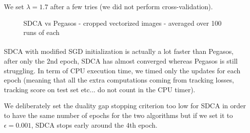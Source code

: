 \documentclass[10pt,a4paper]{article}
\begin{document}
We set $\lambda = 1.7$ after a few tries (we did not perform cross-validation). 


\begin{figure}[!tbp]
  \centering
  \hfill
  \hfill
  \caption{SDCA vs Pegasos - cropped vectorized images - averaged over 100 runs of each}\label{comparison_original}
\end{figure}


\paragraph{}
SDCA with modified SGD initialization is actually a lot faster than Pegasos, after only the $2$nd epoch, SDCA has almost converged whereas Pegasos is still struggling. In term of CPU execution time, we timed only the updates for each epoch (meaning that all the extra computations coming from tracking losses, tracking score on test set etc... do not count in the CPU timer).

We deliberately set the duality gap stopping criterion too low for SDCA in order to have the same number of epochs for the two algorithms but if we set it to $\epsilon=0.001$, SDCA stops early around the $4$th epoch.




\appendix
\end{document}
